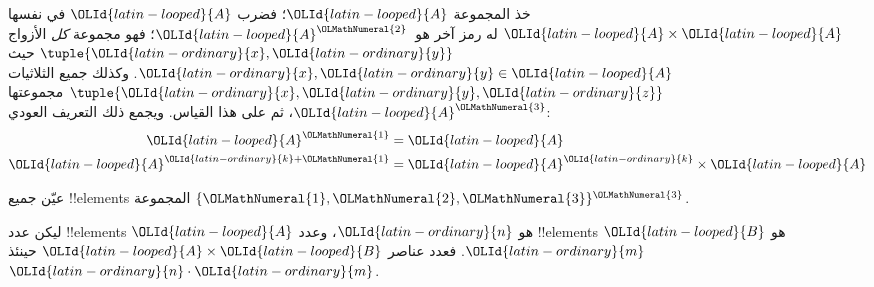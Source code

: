 \documentclass[../../../include/open-logic-section]{subfiles}
\begin{document}
\begin{ex}
خذ المجموعة $\OLId{latin-looped}{A}$؛ فضرب $\OLId{latin-looped}{A}$ في نفسها $\OLId{latin-looped}{A} \times \OLId{latin-looped}{A}$ له رمز آخر هو~$\OLId{latin-looped}{A}^\OLMathNumeral{2}$؛
فهو مجموعة \emph{كل} الأزواج $\tuple{\OLId{latin-ordinary}{x}, \OLId{latin-ordinary}{y}}$ حيث $\OLId{latin-ordinary}{x}, \OLId{latin-ordinary}{y} \in \OLId{latin-looped}{A}$.
وكذلك جميع الثلاثيات $\tuple{\OLId{latin-ordinary}{x}, \OLId{latin-ordinary}{y}, \OLId{latin-ordinary}{z}}$ مجموعتها $\OLId{latin-looped}{A}^\OLMathNumeral{3}$، ثم على هذا
القياس. ويجمع ذلك التعريف العودي:
\begin{align*}
  \OLId{latin-looped}{A}^\OLMathNumeral{1} & = \OLId{latin-looped}{A}\\
  \OLId{latin-looped}{A}^{\OLId{latin-ordinary}{k}+\OLMathNumeral{1}} & = \OLId{latin-looped}{A}^\OLId{latin-ordinary}{k} \times \OLId{latin-looped}{A}
\end{align*}
\end{ex}

\begin{prob}
عيّن جميع !!{element}s المجموعة $\{\OLMathNumeral{1}, \OLMathNumeral{2}, \OLMathNumeral{3}\}^\OLMathNumeral{3}$.
\end{prob}

\begin{prop}
ليكن عدد !!{element}s $\OLId{latin-looped}{A}$ هو $\OLId{latin-ordinary}{n}$، وعدد !!{element}s $\OLId{latin-looped}{B}$ هو $\OLId{latin-ordinary}{m}$.
فعدد عناصر $\OLId{latin-looped}{A} \times \OLId{latin-looped}{B}$ حينئذ $\OLId{latin-ordinary}{n}\cdot \OLId{latin-ordinary}{m}$.
\end{prop}
\end{document}
